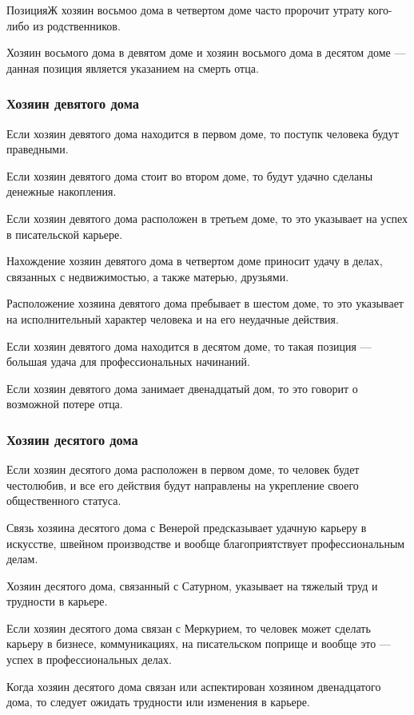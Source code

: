 ПозицияЖ хозяин восьмоо дома в четвертом доме часто пророчит утрату кого-либо из родственников.

Хозяин восьмого дома в девятом доме и хозяин восьмого дома в десятом доме --- данная позиция является указанием на смерть отца.

\subsubsection*{Хозяин девятого дома}
Если хозяин девятого дома находится в первом доме, то поступк человека будут праведными.

Если хозяин девятого дома стоит во втором доме, то будут удачно сделаны денежные накопления.

Если хозяин девятого дома расположен в третьем доме, то это указывает на успех в писательской карьере.

Нахождение хозяин девятого дома в четвертом доме приносит удачу в делах, связанных с недвижимостью, а также матерью, друзьями.

Расположение хозяина девятого дома пребывает в шестом доме, то это указывает на исполнительный характер человека и на его неудачные действия.

Если хозяин девятого дома находится в десятом доме, то такая позиция --- большая удача для профессиональных начинаний.

Если хозяин девятого дома занимает двенадцатый дом, то это говорит о возможной потере отца.

\subsubsection*{Хозяин десятого дома}
Если хозяин десятого дома расположен в первом доме, то человек будет честолюбив, и все его действия будут направлены на укрепление своего общественного статуса.

Связь хозяина десятого дома с Венерой предсказывает удачную карьеру в искусстве, швейном производстве и вообще благоприятствует профессиональным делам.

Хозяин десятого дома, связанный с Сатурном, указывает на тяжелый труд и трудности в карьере.

Если хозяин десятого дома связан с Меркурием, то человек может сделать карьеру в бизнесе, коммуникациях, на писательском поприще и вообще это --- успех в профессиональных делах.

Когда хозяин десятого дома связан или аспектирован хозяином двенадцатого дома, то следует ожидать трудности или изменения в карьере.

